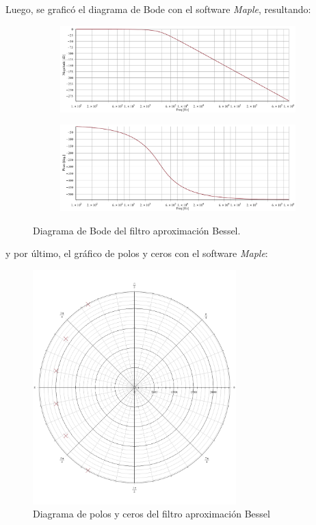 Luego, se graficó el diagrama de Bode con el software \textit{Maple}, resultando:
\begin{figure}[H]
	\begin{subfigure}{\textwidth}
	\centering
	\includegraphics[width=\textwidth]{Imagenes-Ej1/bessel_hs.png}
	\end{subfigure}
	
	\begin{subfigure}{\textwidth}
	\centering
	\includegraphics[width=\textwidth]{Imagenes-Ej1/bessel_hspha.png}
	\end{subfigure}
	\label{fig:bodebes}
	\caption{Diagrama de Bode del filtro aproximación Bessel.}
\end{figure}
y por último, el gráfico de polos y ceros con el software \textit{Maple}:

\begin{figure}[H]
\centering
	\centering
	\includegraphics[width=0.7\textwidth]{Imagenes-Ej1/bessel_poles.png}
	\caption{Diagrama de polos y ceros del filtro aproximación Bessel}
	\label{leg_poles}
\end{figure}

